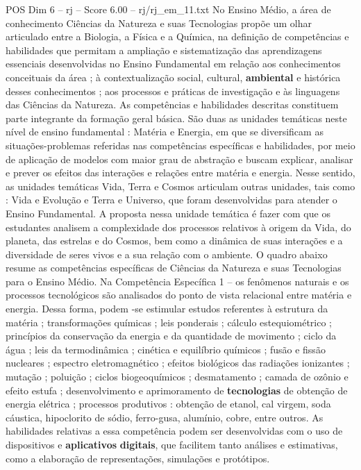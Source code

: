 \begin{textsample}{POS Dim 6 – rj – Score 6.00 – rj/rj\_em\_11.txt}
No Ensino Médio, a área de conhecimento Ciências da Natureza e suas Tecnologias propõe um olhar articulado entre a Biologia, a Física e a Química, na definição de competências e habilidades que permitam a ampliação e sistematização das aprendizagens essenciais desenvolvidas no Ensino Fundamental em relação aos conhecimentos conceituais da área ; à contextualização social, cultural, \textbf{ambiental} e histórica desses conhecimentos ; aos processos e práticas de investigação e às linguagens das Ciências da Natureza.
As competências e habilidades descritas constituem parte integrante da formação geral básica.
São duas as unidades temáticas neste nível de ensino fundamental : Matéria e Energia, em que se diversificam as situações-problemas referidas nas competências específicas e habilidades, por meio de aplicação de modelos com maior grau de abstração e buscam explicar, analisar e prever os efeitos das interações e relações entre matéria e energia.
Nesse sentido, as unidades temáticas Vida, Terra e Cosmos articulam outras unidades, tais como : Vida e Evolução e Terra e Universo, que foram desenvolvidas para atender o Ensino Fundamental.
A proposta nessa unidade temática é fazer com que os estudantes analisem a complexidade dos processos relativos à origem da Vida, do planeta, das estrelas e do Cosmos, bem como a dinâmica de suas interações e a diversidade de seres vivos e a sua relação com o ambiente.
O quadro abaixo resume as competências específicas de Ciências da Natureza e suas Tecnologias para o Ensino Médio.
Na Competência Específica 1 – os fenômenos naturais e os processos tecnológicos são analisados do ponto de vista relacional entre matéria e energia.
Dessa forma, podem -se estimular estudos referentes à estrutura da matéria ; transformações químicas ; leis ponderais ; cálculo estequiométrico ; princípios da conservação da energia e da quantidade de movimento ; ciclo da água ; leis da termodinâmica ; cinética e equilíbrio químicos ; fusão e fissão nucleares ; espectro eletromagnético ; efeitos biológicos das radiações ionizantes ; mutação ; poluição ; ciclos biogeoquímicos ; desmatamento ; camada de ozônio e efeito estufa ; desenvolvimento e aprimoramento de \textbf{tecnologias} de obtenção de energia elétrica ; processos produtivos : obtenção de etanol, cal virgem, soda cáustica, hipoclorito de sódio, ferro-gusa, alumínio, cobre, entre outros.
As habilidades relativas a essa competência podem ser desenvolvidas com o uso de dispositivos e \textbf{aplicativos} \textbf{digitais}, que facilitem tanto análises e estimativas, como a elaboração de representações, simulações e protótipos.

\end{textsample}
